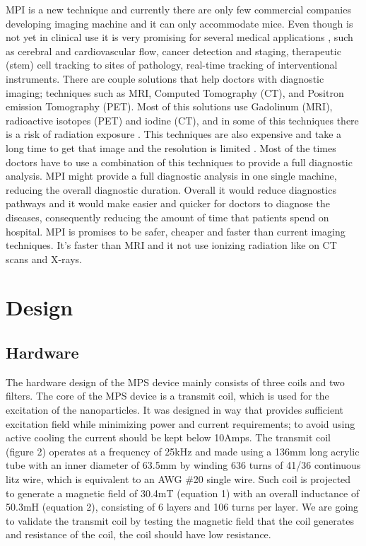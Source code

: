 \documentclass[fleqn,10pt]{document} %
\begin{document}
MPI is a new technique and currently there are only few commercial companies developing imaging machine and it can only accommodate mice. Even though is not yet in clinical use it is very promising for several medical applications \cite{p11}, such as cerebral and cardiovascular flow, cancer detection and staging, therapeutic (stem) cell tracking to sites of pathology, real-time tracking of interventional instruments. There are couple solutions that help doctors with diagnostic imaging; techniques such as MRI, Computed Tomography (CT), and Positron emission Tomography (PET). Most of this solutions use Gadolinum (MRI), radioactive isotopes (PET) and iodine (CT), and in some of this techniques there is a risk of radiation exposure \cite{p12}. This techniques are also expensive and take a long time to get that image and the resolution is limited \cite{p12}. Most of the times doctors have to use a combination of this techniques to provide a full diagnostic analysis. MPI might provide a full diagnostic analysis in one single machine, reducing the overall
diagnostic duration. Overall it would reduce diagnostics
pathways and it would make easier and quicker for doctors to diagnose the diseases, consequently
reducing the amount of time that patients spend on hospital.
MPI is promises to be safer, cheaper and faster than current imaging techniques. It’s faster than MRI and it not use ionizing radiation like on CT scans and X-rays.

	\section{Design}
	\subsection{Hardware}
	
The hardware design of the MPS device mainly consists of three coils and two filters.
The core of the MPS device is a transmit coil, which is used for the excitation of the nanoparticles. It was designed in way that provides sufficient excitation field while minimizing power and current requirements; to avoid using active cooling the current should be kept below 10Amps. The transmit coil (figure 2) operates at a frequency of 25kHz and made using a 136mm long acrylic tube with an inner diameter of 63.5mm by winding 636 turns of 41/36 continuous litz wire, which is equivalent to an AWG \#20 single wire. Such coil is projected to generate a magnetic field of 30.4mT (equation 1) with an overall inductance of 50.3mH (equation 2), consisting of 6 layers and 106 turns per layer. We are going to validate the transmit coil by testing the magnetic field that the coil generates and  resistance of the coil, the coil should have low resistance. 
\end{document}
